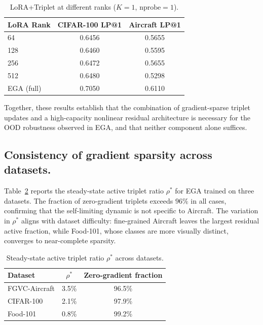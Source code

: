 \documentclass{article}
\begin{document}
\begin{table}[!h]
	\centering
	\caption{LoRA+Triplet at different ranks ($K{=}1$, $\text{nprobe}{=}1$).}
	\label{tab:lora_rank}
	\small
	\begin{tabular}{lcc}
		\toprule
		LoRA Rank  & CIFAR-100 LP@1 & Aircraft LP@1 \\
		\midrule
		64         & 0.6456         & 0.5655        \\
		128        & 0.6460         & 0.5595        \\
		256        & 0.6472         & 0.5655        \\
		512        & 0.6480         & 0.5298        \\
		\midrule
		EGA (full) & 0.7050         & 0.6110        \\
		\bottomrule
	\end{tabular}
\end{table}

Together, these results establish that the combination of gradient-sparse triplet updates and a high-capacity nonlinear residual architecture is necessary for the OOD robustness observed in EGA, and that neither component alone suffices.

\subsection{Consistency of gradient sparsity across datasets.}
\label{appendix:rho}

Table~\ref{tab:rho_datasets} reports the steady-state active triplet ratio $\rho^*$ for EGA trained on three datasets.
The fraction of zero-gradient triplets exceeds $96\%$ in all cases, confirming that the self-limiting dynamic is not specific to Aircraft.
The variation in $\rho^*$ aligns with dataset difficulty: fine-grained Aircraft leaves the largest residual active fraction, while Food-101, whose classes are more visually distinct, converges to near-complete sparsity.

\begin{table}[!h]
	\centering
	\caption{Steady-state active triplet ratio $\rho^*$ across datasets.}
	\label{tab:rho_datasets}
	\begin{tabular}{lcc}
		\toprule
		Dataset       & $\rho^*$ & Zero-gradient fraction \\
		\midrule
		FGVC-Aircraft & 3.5\%    & 96.5\%                 \\
		CIFAR-100     & 2.1\%    & 97.9\%                 \\
		Food-101      & 0.8\%    & 99.2\%                 \\
		\bottomrule
	\end{tabular}
\end{table}
\end{document}

